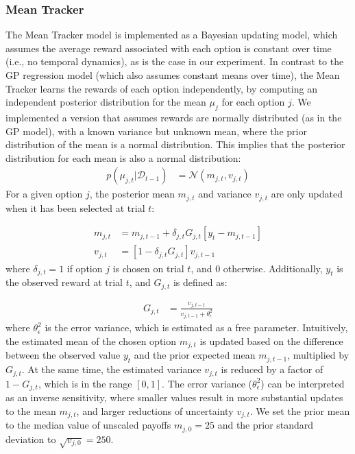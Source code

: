 \subsubsection*{Mean Tracker} 

The Mean Tracker model is implemented as a Bayesian updating model, which assumes the average reward associated with each option is constant over time (i.e., no temporal dynamics), as is the case in our experiment. In contrast to the GP regression model (which also assumes constant means over time), the Mean Tracker learns the rewards of each option independently, by computing an independent posterior distribution for the mean $\mu_j$ for each option $j$. We implemented a version that assumes rewards are normally distributed (as in the GP model), with a known variance but unknown mean, where the prior distribution of the mean is a normal distribution. This implies that the posterior distribution for each mean is also a normal distribution: 
\begin{align}
p(\mu_{j,t}|\mathcal{D}_{t-1}) &= \mathcal{N}(m_{j,t},v_{j,t})
\end{align}
For a given option $j$, the posterior mean $m_{j,t}$ and variance $v_{j,t}$ are only updated when it has been selected at trial $t$:

\begin{align}
m_{j,t} &= m_{j,t-1} + \delta_{j,t}G_{j,t}\left[y_t-m_{j,t-1}\right]\\
v_{j,t} &= \left[1 - \delta_{j,t}G_{j,t}\right]v_{j,t-1} 
\end{align}
where $\delta_{j,t}=1$ if option $j$ is chosen on trial $t$, and $0$ otherwise. Additionally, $y_t$ is the observed reward at trial $t$, and $G_{j,t}$ is defined as:

\begin{align}
G_{j,t} &= \frac{v_{j,t-1}}{v_{j,t-1}+ \theta_\epsilon^2}
\end{align}
where $\theta_\epsilon^2$ is the error variance, which is estimated as a free parameter. Intuitively, the estimated mean of the chosen option $m_{j,t}$ is updated based on the difference between the observed value $y_t$ and the prior expected mean $m_{j,t-1}$, multiplied by $G_{j,t}$. At the same time, the estimated variance $v_{j,t}$ is reduced by a factor of $1 - G_{j,t}$, which is in the range $[0,1]$. The error variance ($\theta_\epsilon^2$) can be interpreted as an inverse sensitivity, where smaller values result in more substantial updates to the mean $m_{j,t}$, and larger reductions of uncertainty $v_{j,t}$. We set the prior mean to the median value of unscaled payoffs $m_{j,0}=25$ and the prior standard deviation to $\sqrt{v_{j,0}}=250$.

